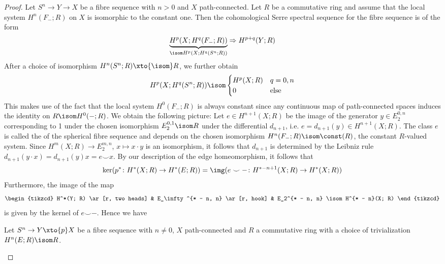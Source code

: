 \begin{proof}
	Let $S^n \to Y \to X$ be a fibre sequence with $n > 0$ and $X$ path-connected.
	Let $R$ be a commutative ring and assume that the local system $H^n(F_{-}; R)$ on $X$ is isomorphic to the constant one.
	Then the cohomological Serre spectral sequence for the fibre sequence is of the form
	\begin{equation*}
		\underbrace{H^p(X; H^q(F_{-}; R))}_{\isom H^p(X; H^q(S^n; R))} \Rightarrow H^{p + q}(Y; R)
	\end{equation*}
	After a choice of isomorphism $H^n(S^n; R) \xto{\isom} R$, we further obtain
	\begin{equation*}
		H^p(X; H^q(S^n; R)) \isom \begin{cases}
			H^p(X; R) 	& q = 0, n \\
			0 			& \text{else}
		\end{cases}
	\end{equation*}
	This makes use of the fact that the local system $H^0(F_{-}; R)$ is always constant since any continuous map of path-connected spaces induces the identity on $R \isom H^0({{-}}; R)$.
	We obtain the following picture:
	Let $e \in H^{n + 1}(X; R)$ be the image of the generator $y \in E_2^{0, n}$ corresponding to 1 under the chosen isomorphism $E_2^{0, 1} \isom R$ under the differential $d_{n + 1}$, i.e. $e = d_{n + 1}(y) \in H^{n + 1}(X; R)$.
	The class $e$ is called the  of the spherical fibre sequence and depends on the chosen isomorphism $H^n(F_{-}; R) \isom \const(R)$, the constant $R$-valued system.
	Since $H^m(X; R) \to E_2^{m, n}$, $x \mapsto x \cdot y$ is an isomorphism, it follows that $d_{n + 1}$ is determined by the Leibniz rule $d_{n + 1}(y \cdot x) = d_{n + 1}(y) x = e \smile x$.
	By our description of the edge homeomorphism, it follows that
	\begin{equation*}
		\ker(p^*\colon H^*(X; R) \to H^*(E; R)) = \img(e \smile {{-}}\colon H^{* - n + 1}(X; R) \to H^*(X; R))
	\end{equation*}
	Furthermore, the image of the map
	\begin{equation*}
		\begin{tikzcd}
			H^*(Y; R)
					\ar[r, two heads]
				& E_\infty^{* - n, n}
					\ar[r, hook]
				& E_2^{* - n, n} \isom H^{* - n}(X; R)
		\end{tikzcd}
	\end{equation*}
	is given by the kernel of $e \smile {{-}}$.
	Hence we have
	\begin{corollary}
		Let $S^n \to Y \xto{p} X$ be a fibre sequence with $n \neq 0$, $X$ path-connected and $R$ a commutative ring with a choice of trivialization $H^n(E; R) \isom R$.

\end{corollary}
\end{proof}
